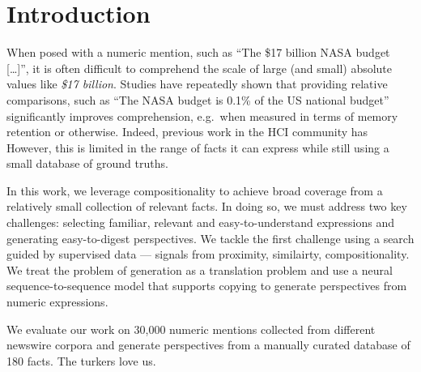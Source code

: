 \section{Introduction}

When posed with a numeric mention, such as ``The \$17 billion NASA budget [\dots]'', it is often difficult to comprehend the scale of large (and small) absolute values like \textit{\$17 billion}. 
Studies have repeatedly shown\needcite{} that providing relative comparisons, such as ``The NASA budget is 0.1\% of the US national budget'' significantly improves comprehension, e.g.\ when measured in terms of memory retention or otherwise.
Indeed, previous work in the HCI community has 
However, this is limited in the range of facts it can express while still using a small database of ground truths.

In this work, we leverage compositionality to achieve broad coverage from a relatively small collection of relevant facts.
In doing so, we must address two key challenges: selecting familiar, relevant and easy-to-understand expressions and generating easy-to-digest perspectives.
We tackle the first challenge using a search guided by supervised data --- signals from proximity, similairty, compositionality.
We treat the problem of generation as a translation problem and use a neural sequence-to-sequence model that supports copying to generate perspectives from numeric expressions.

We evaluate our work on 30,000 numeric mentions collected from different newswire corpora and generate perspectives from a manually curated database of 180 facts.
The turkers love us. \citep{manning99nlp}

